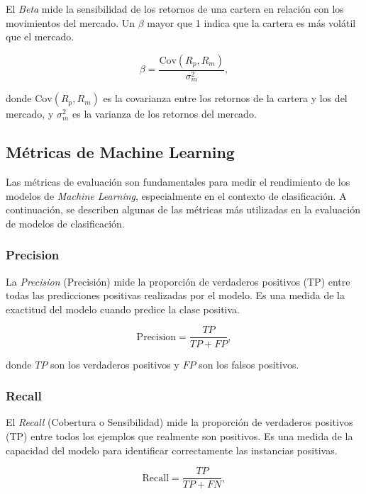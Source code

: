 \documentclass[a4paper,12pt, twoside]{report}
\begin{document}
El \textit{Beta} mide la sensibilidad de los retornos de una cartera en relación con los movimientos del mercado. Un $\beta$ mayor que 1 indica que la cartera es más volátil que el mercado.

\begin{equation}
\beta = \frac{\text{Cov}(R_p, R_m)}{\sigma^2_m},
\end{equation}

donde $\text{Cov}(R_p, R_m)$ es la covarianza entre los retornos de la cartera y los del mercado, y $\sigma^2_m$ es la varianza de los retornos del mercado.

\subsection{Métricas de Machine Learning}

Las métricas de evaluación son fundamentales para medir el rendimiento de los modelos de \textit{Machine Learning}, especialmente en el contexto de clasificación. A continuación, se describen algunas de las métricas más utilizadas en la evaluación de modelos de clasificación.

\subsubsection{Precision}

La \textit{Precision} (Precisión) mide la proporción de verdaderos positivos (TP) entre todas las predicciones positivas realizadas por el modelo. Es una medida de la exactitud del modelo cuando predice la clase positiva.

\begin{equation}
\text{Precision} = \frac{TP}{TP + FP},
\end{equation}

donde $TP$ son los verdaderos positivos y $FP$ son los falsos positivos.

\subsubsection{Recall}

El \textit{Recall} (Cobertura o Sensibilidad) mide la proporción de verdaderos positivos (TP) entre todos los ejemplos que realmente son positivos. Es una medida de la capacidad del modelo para identificar correctamente las instancias positivas.

\begin{equation}
\text{Recall} = \frac{TP}{TP + FN},
\end{equation}
\end{document}
